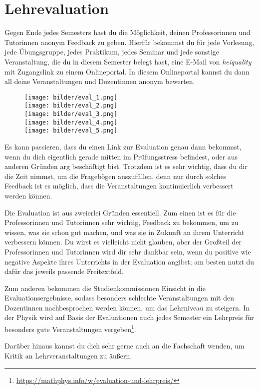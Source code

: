 \section{Lehrevaluation}
\label{eval}

Gegen Ende jedes Semesters hast du die Möglichkeit, deinen Professorinnen und Tutorinnen anonym Feedback zu geben. Hierfür bekommst du für jede Vorlesung, jede Übungsgruppe, jedes Praktikum, jedes Seminar und jede sonstige Veranstaltung, die du in diesem Semester belegt hast, eine E-Mail von \textit{heiquality} mit Zugangslink zu einem Onlineportal. In diesem Onlineportal kannst du dann all deine Veranstaltungen und Dozentinnen anonym bewerten.

\begin{figure}[b]
    \begin{center}
        \texttt{[image: bilder/eval\_1.png]}\\
        \texttt{[image: bilder/eval\_2.png]}\\
        \texttt{[image: bilder/eval\_3.png]}\\
        \texttt{[image: bilder/eval\_4.png]}\\
        \texttt{[image: bilder/eval\_5.png]}\\
    \end{center}
\end{figure}

Es kann passieren, dass du einen Link zur Evaluation genau dann bekommst, wenn du dich eigentlich gerade mitten im Prüfungsstress befindest, oder aus anderen Gründen arg beschäftigt bist. Trotzdem ist es sehr wichtig, dass du dir die Zeit nimmst, um die Fragebögen auszufüllen, denn nur durch solches Feedback ist es möglich, dass die Veranstaltungen kontinuierlich verbessert werden können.

Die Evaluation ist aus zweierlei Gründen essentiell.
Zum einen ist es für die Professorinnen und Tutorinnen sehr wichtig, Feedback zu bekommen, um zu wissen, was sie schon gut machen, und was sie in Zukunft an ihrem Unterricht verbessern können. Du wirst es vielleicht nicht glauben, aber der Großteil der Professorinnen und Tutorinnen wird dir sehr dankbar sein, wenn du positive wie negative Aspekte ihres Unterrichts in der Evaluation angibst; am besten nutzt du dafür das jeweils passende Freitextfeld.

Zum anderen bekommen die Studienkommissionen Einsicht in die Evaluationsergebnisse, sodass besonders schlechte Veranstaltungen mit den Dozentinnen nachbesprochen werden können, um das Lehrniveau zu steigern. In der Physik wird auf Basis der Evaluationen auch jedes Semester ein Lehrpreis für besonders gute Veranstaltungen vergeben\footnote{\url{https://mathphys.info/w/evaluation-und-lehrpreis/}}.

Darüber hinaus kannst du dich sehr gerne auch an die Fachschaft wenden, um Kritik an Lehrveranstaltungen zu äußern.
